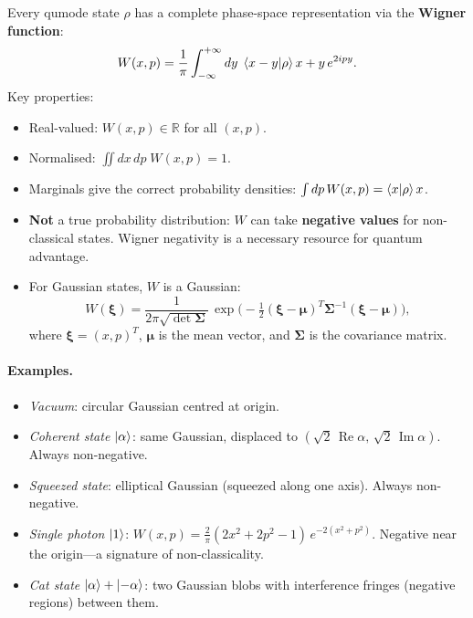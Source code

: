\documentclass[11pt]{article}
\newcommand{\CR}{\mathbb{R}}
\begin{document}
Every qumode state $\rho$ has a complete phase-space representation via
the \textbf{Wigner function}:
\begin{equation}\label{eq:wigner}
W(x, p) = \frac{1}{\pi}\int_{-\infty}^{+\infty} dy\;
\braket{x - y}{\rho}{x + y}\, e^{2ipy}.
\end{equation}
Key properties:
\begin{itemize}[nosep]
\item Real-valued: $W(x,p) \in \CR$ for all $(x,p)$.
\item Normalised: $\iint dx\, dp\; W(x,p) = 1$.
\item Marginals give the correct probability densities:
  $\int dp\, W(x,p) = \braket{x}{\rho}{x}$.
\item \textbf{Not} a true probability distribution: $W$ can take
  \textbf{negative values} for non-classical states.
  Wigner negativity is a necessary resource for quantum advantage.
\item For Gaussian states, $W$ is a Gaussian:
  \[
  W(\bm{\xi}) = \frac{1}{2\pi\sqrt{\det\bm{\Sigma}}}\,
  \exp\!\Big(-\tfrac{1}{2}(\bm{\xi} - \bm{\mu})^T\bm{\Sigma}^{-1}
  (\bm{\xi} - \bm{\mu})\Big),
  \]
  where $\bm{\xi} = (x, p)^T$, $\bm{\mu}$ is the mean vector, and
  $\bm{\Sigma}$ is the covariance matrix.
\end{itemize}

\paragraph{Examples.}
\begin{itemize}[nosep]
\item \emph{Vacuum}: circular Gaussian centred at origin.
\item \emph{Coherent state $\ket{\alpha}$}: same Gaussian, displaced
  to $(\sqrt{2}\,\operatorname{Re}\alpha,\, \sqrt{2}\,\operatorname{Im}\alpha)$.
  Always non-negative.
\item \emph{Squeezed state}: elliptical Gaussian (squeezed along one axis).
  Always non-negative.
\item \emph{Single photon $\ket{1}$}:
  $W(x,p) = \frac{2}{\pi}(2x^2 + 2p^2 - 1)\,e^{-2(x^2+p^2)}$.
  Negative near the origin---a signature of non-classicality.
\item \emph{Cat state $\ket{\alpha} + \ket{-\alpha}$}: two Gaussian
  blobs with interference fringes (negative regions) between them.
\end{itemize}

\end{document}
